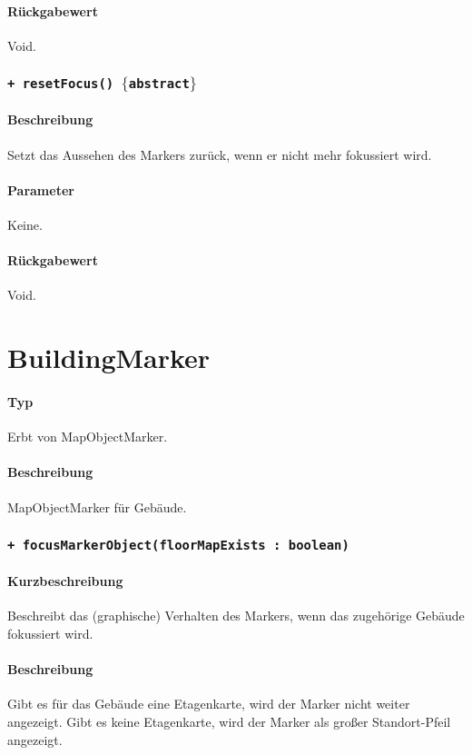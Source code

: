 \paragraph*{Rückgabewert}
Void.

\subsubsection{\texttt{+ resetFocus() $\lbrace$abstract$\rbrace$}}%
\paragraph*{Beschreibung}
Setzt das Aussehen des Markers zurück, wenn er nicht mehr fokussiert wird.
\paragraph*{Parameter}
Keine.
\paragraph*{Rückgabewert}
Void.

\section{BuildingMarker}
\paragraph*{Typ} 
Erbt von MapObjectMarker.
\paragraph*{Beschreibung}
MapObjectMarker für Gebäude.

\subsubsection{\texttt{+ focusMarkerObject(floorMapExists : boolean)}}%
\paragraph*{Kurzbeschreibung}
Beschreibt das (graphische) Verhalten des Markers, wenn das zugehörige Gebäude fokussiert wird.
\paragraph*{Beschreibung}
Gibt es für das Gebäude eine Etagenkarte, wird der Marker nicht weiter angezeigt.
Gibt es keine Etagenkarte, wird der Marker als großer Standort-Pfeil angezeigt.
